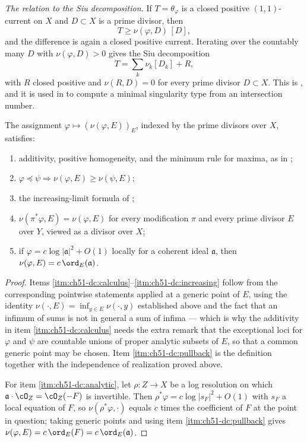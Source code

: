 \emph{The relation to the Siu decomposition.}  If
\(T=\theta_\varphi\) is a closed positive \((1,1)\)-current on \(X\) and
\(D\subset X\) is a prime divisor, then
\[
 T\geq\nu(\varphi,D)\,[D],
\]
and the difference is again a closed positive current.  Iterating over the
countably many \(D\) with \(\nu(\varphi,D)>0\) gives the Siu
decomposition
\[
 T=\sum_{k}\nu_k[D_k]+R,
\]
with \(R\) closed positive and \(\nu(R,D)=0\) for every prime divisor
\(D\subset X\).  This is \cite{Siu74}, and it is used in
 to compute a minimal singularity type from an
intersection number.

\begin{proposition}\label{prop:ch51-divisorial-calculus}
The assignment \(\varphi\mapsto(\nu(\varphi,E))_E\), indexed by the prime
divisors over \(X\), satisfies:
\begin{enumerate}
\item\label{itm:ch51-dc:calculus}
      additivity, positive homogeneity, and the minimum rule for maxima,
      as in ;
\item\label{itm:ch51-dc:monotone}
      \(\varphi\preceq\psi\Rightarrow\nu(\varphi,E)\geq\nu(\psi,E)\);
\item\label{itm:ch51-dc:increasing}
      the increasing-limit formula of ;
\item\label{itm:ch51-dc:pullback}
      \(\nu(\pi^*\varphi,E)=\nu(\varphi,E)\) for every modification
      \(\pi\) and every prime divisor \(E\) over \(Y\), viewed as a
      divisor over \(X\);
\item\label{itm:ch51-dc:analytic}
      if \(\varphi=c\log|\mathfrak a|^2+O(1)\) locally for a coherent
      ideal \(\mathfrak a\), then
      \(\nu(\varphi,E)=c\,\ord_E(\mathfrak a)\).
\end{enumerate}
\end{proposition}

\begin{proof}
Items \cref{itm:ch51-dc:calculus}--\cref{itm:ch51-dc:increasing} follow from
the corresponding pointwise statements applied at a generic point of
\(E\), using the identity \(\nu(\cdot,E)=\inf_{y\in E}\nu(\cdot,y)\)
established above and the fact that an infimum of sums is not in general a
sum of infima --- which is why the additivity in item
\cref{itm:ch51-dc:calculus} needs the extra remark that the exceptional
loci for \(\varphi\) and \(\psi\) are countable unions of proper analytic
subsets of \(E\), so that a common generic point may be chosen.  Item
\cref{itm:ch51-dc:pullback} is the definition together with the
independence of realization proved above.

For item \cref{itm:ch51-dc:analytic}, let \(\rho:Z\to X\) be a log
resolution on which \(\mathfrak a\cdot\cO_Z=\cO_Z(-F)\) is invertible.
Then \(\rho^*\varphi=c\log|s_F|^2+O(1)\) with \(s_F\) a local equation of
\(F\), so \(\nu(\rho^*\varphi,\cdot)\) equals \(c\) times the coefficient
of \(F\) at the point in question; taking generic points and using item
\cref{itm:ch51-dc:pullback} gives
\(\nu(\varphi,E)=c\,\ord_E(F)=c\,\ord_E(\mathfrak a)\).
\end{proof}

